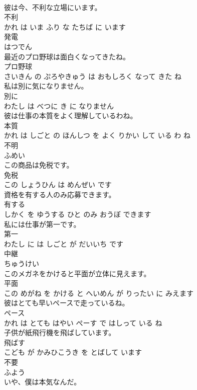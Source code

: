 \documentclass[8pt]{extreport}
\begin{document}
\begin{CJK}{UTF8}{min}
\\	彼は今、不利な立場にいます。	
\\	不利 
\\	かれ は いま ふり な たちば に います			
\\	発電	
\\	はつでん			
\\	最近のプロ野球は面白くなってきたね。	
\\	プロ野球 
\\	さいきん の ぷろやきゅう は おもしろく なって きた ね			
\\	私は別に気になりません。	
\\	別に 
\\	わたし は べつに き に なりません			
\\	彼は仕事の本質をよく理解しているわね。	
\\	本質 
\\	かれ は しごと の ほんしつ を よく りかい して いる わ ね			
\\	不明	
\\	ふめい			
\\	この商品は免税です。	
\\	免税 
\\	この しょうひん は めんぜい です			
\\	資格を有する人のみ応募できます。	
\\	有する 
\\	しかく を ゆうする ひと のみ おうぼ できます			
\\	私には仕事が第一です。	
\\	第一 
\\	わたし に は しごと が だいいち です			
\\	中継	
\\	ちゅうけい			
\\	このメガネをかけると平面が立体に見えます。	
\\	平面 
\\	この めがね を かける と へいめん が りったい に みえます			
\\	彼はとても早いペースで走っているね。	
\\	ペース 
\\	かれ は とても はやい ぺーす で はしって いる ね			
\\	子供が紙飛行機を飛ばしています。	
\\	飛ばす 
\\	こども が かみひこうき を とばして います			
\\	不要	
\\	ふよう			
\\	いや、僕は本気なんだ。	

\end{CJK}
\end{document}
